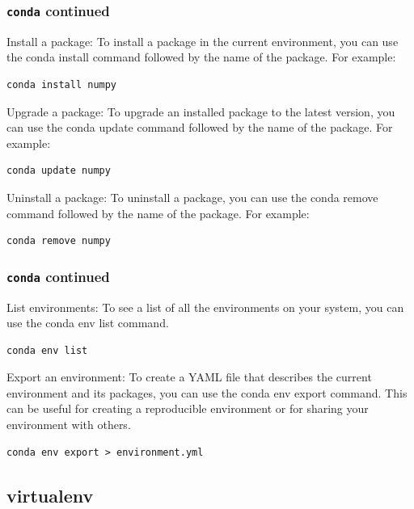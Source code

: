 \documentclass{beamer}
\begin{document}
\begin{frame}[fragile]
  \frametitle{\texttt{conda} continued}

  Install a package: To install a package in the current environment, you can use the conda install command followed by the name of the package. For example:

  \begin{lstlisting}
conda install numpy
\end{lstlisting}

  Upgrade a package: To upgrade an installed package to the latest version, you can use the conda update command followed by the name of the package. For example:

  \begin{lstlisting}
conda update numpy
\end{lstlisting}

  Uninstall a package: To uninstall a package, you can use the conda remove command followed by the name of the package. For example:

  \begin{lstlisting}
conda remove numpy
\end{lstlisting}

\end{frame}



\begin{frame}[fragile]
  \frametitle{\texttt{conda} continued}

  List environments: To see a list of all the environments on your system, you can use the conda env list command.

  \begin{lstlisting}
conda env list
\end{lstlisting}

  Export an environment: To create a YAML file that describes the current environment and its packages, you can use the conda env export command. This can be useful for creating a reproducible environment or for sharing your environment with others.

  \begin{lstlisting}
conda env export > environment.yml
\end{lstlisting}

\end{frame}

\subsection{virtualenv}
\end{document}
